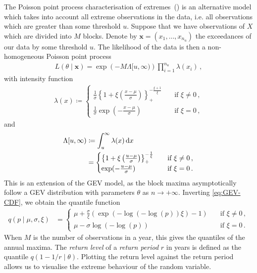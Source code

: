 \documentclass{article}
\newcommand{\dd}{{\rm d}}
\begin{document}
%
The Poisson point process characterisation of extremes~(\cite{coles2001})
is an alternative model which takes into account
all extreme observations in the data,
i.e. all observations which are greater than some threshold $u$.
Suppose that we have observations of $X$
which are divided into $M$ blocks.
Denote by $\mathbf{x}=(x_1, \dots, x_{n_u})$
the exceedances of our data by some threshold $u$.
The likelihood of the data is then a non-homogeneous
Poisson point process
%
\begin{align}
	L(\theta \mid \mathbf{x})
		= \exp \left(-M \Lambda[u, \infty)\right)
		\prod_{i = 1}^{n_u} \lambda(x_i) \,,
	\label{eq:likelihood}
\end{align}
%
with intensity function
%
\begin{align}
	\lambda(x) \coloneqq
	\begin{cases}
		\frac{1}{\sigma}
			\left\{1 + \xi \left(\frac{x - \mu}{\sigma}\right)\right\}_+
			^ {-\frac{\xi + 1}{\xi}}
			&\quad \text{if $\xi \neq 0$} \,,\\
		\frac{1}{\sigma}\exp(-\frac{x - \mu}{\sigma})
			&\quad \text{if $\xi = 0$} \,,
	\end{cases}
	\label{eq:GP}
\end{align}
%
and
% 
\begin{align}
	\Lambda[u, \infty) &\coloneqq \int_u ^ \infty \lambda(x) \, \dd x \\
	&=
		\begin{cases}
			\left\{1 + \xi \left(\frac{u - \mu}{\sigma}\right)\right\}_+
			^ {-\frac{1}{\xi}}
			&\quad \text{if $\xi \neq 0$} \,,\\
			\exp(-\frac{u - \mu}{\sigma})
			&\quad \text{if $\xi = 0$} \,.
		\end{cases}
	\label{eq:Lambda}
\end{align}
%
This is an extension of the GEV model,
as the block maxima
asymptotically follow a GEV distribution with parameters $\theta$
as $n \to +\infty$.
Inverting \eqref{eq:GEV-CDF}, we obtain the quantile function
%
\begin{align}
	q(p \mid \mu, \sigma, \xi) &=
	\begin{cases}
		\mu + \frac{\sigma}{\xi} (\exp(-\log(-\log(p)) \xi) - 1)
			&\quad \text{if $\xi \neq 0$}\,,\\
		\mu - \sigma \log(-\log(p))
			&\quad \text{if $\xi = 0$} \,.
	\end{cases}
	\label{eq:quantile}
\end{align}
%
When $M$ is the number of observations in a year,
this gives the quantiles of the annual maxima.
The \textit{return level} of a \textit{return period} $r$ in years
is defined as the quantile $q(1 - 1 / r\mid \theta)$.
Plotting the return level against the return period
allows us to visualise the extreme behaviour of the random variable.
%
\end{document}
